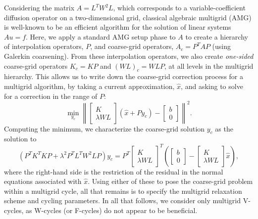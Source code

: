 Considering the matrix $A = L^TW^2L$, which corresponds to a
variable-coefficient diffusion operator on a two-dimensional grid,
classical algebraic multigrid (AMG) is well-known to be an efficient
algorithm for the solution of linear systems $Au=f$.  Here, we apply a
standard AMG setup phase to $A$ to create a hierarchy of interpolation
operators, $P$, and coarse-grid operators, $A_c = P^TAP$ (using
Galerkin coarsening).  From these interpolation operators, we also
create {\it one-sided} coarse-grid operators $K_c = KP$ and $(WL)_c =
WLP$, at all levels in the multigrid hierarchy.  This allows us to
write down the coarse-grid correction process for a multigrid
algorithm, by taking a current approximation, $\hat{x}$, and asking to
solve for a correction in the range of $P$:
\[
\min_{y_c}\left\| \left[\begin{array}{c} K \\ \lambda
      WL\end{array}\right](\hat{x}+Py_c) - \left[\begin{array}{c} b \\ 0 \end{array}\right]\right\|^2.
\]
Computing the minimum, we characterize the coarse-grid solution $y_c$
as the solution to
\[
\left(P^TK^TKP + \lambda^2P^TL^TW^2LP\right)y_c =
P^T\left[\begin{array}{c} K \\ \lambda WL\end{array}\right]^T
\left(\left[\begin{array}{c} b \\ 0 \end{array}\right] - \left[\begin{array}{c} K \\ \lambda
      WL\end{array}\right]\hat{x}\right),
\]
where the right-hand side is the restriction of the residual in the
normal equations associated with $\hat{x}$.  Using either of these to
pose the coarse-grid problem within a multigrid cycle, all that
remains is to specify the multigrid relaxation scheme and cycling
parameters.  In all that follows, we consider only multigrid V-cycles,
as W-cycles (or F-cycles) do not appear to be beneficial.

